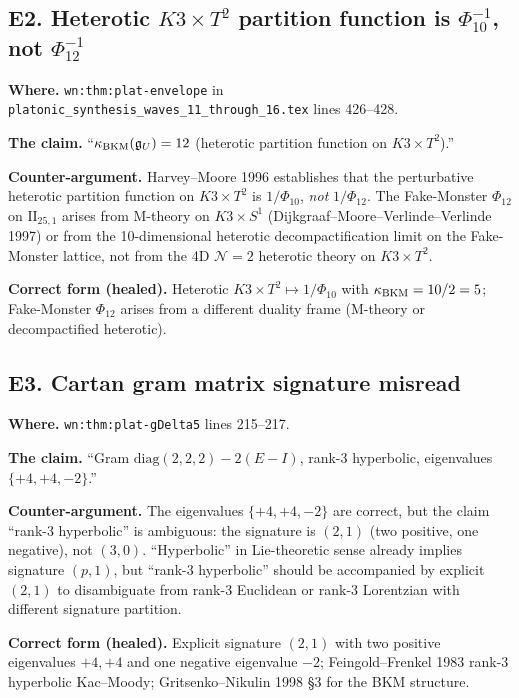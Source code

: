 \subsection*{E2. Heterotic $K3 \times T^2$ partition function is
$\Phi_{10}^{-1}$, not $\Phi_{12}^{-1}$}
\label{wn:subsec:E2-heterotic-Phi10}

\textbf{Where.} \verb|wn:thm:plat-envelope| in
\verb|platonic_synthesis_waves_11_through_16.tex| lines 426--428.

\textbf{The claim.} ``$\kappa_{\mathrm{BKM}}(\mathfrak{g}_U) = 12$ (heterotic partition
function on $K3 \times T^2$).''

\textbf{Counter-argument.} Harvey--Moore 1996 establishes that the
perturbative heterotic partition function on $K3 \times T^2$ is
$1/\Phi_{10}$, \emph{not} $1/\Phi_{12}$. The Fake-Monster $\Phi_{12}$
on $\mathrm{II}_{25, 1}$ arises from M-theory on $K3 \times S^1$
(Dijkgraaf--Moore--Verlinde--Verlinde 1997) or from the 10-dimensional
heterotic decompactification limit on the Fake-Monster lattice, not
from the 4D $\mathcal{N} = 2$ heterotic theory on $K3 \times T^2$.

\textbf{Correct form (healed).} Heterotic $K3 \times T^2 \mapsto
1/\Phi_{10}$ with $\kappa_{\mathrm{BKM}} = 10/2 = 5$; Fake-Monster $\Phi_{12}$ arises
from a different duality frame (M-theory or decompactified heterotic).

\subsection*{E3. Cartan gram matrix signature misread}
\label{wn:subsec:E3-cartan-signature}

\textbf{Where.} \verb|wn:thm:plat-gDelta5| lines 215--217.

\textbf{The claim.} ``Gram $\mathrm{diag}(2, 2, 2) - 2(E - I)$, rank-3
hyperbolic, eigenvalues $\{+4, +4, -2\}$.''

\textbf{Counter-argument.} The eigenvalues $\{+4, +4, -2\}$ are
correct, but the claim ``rank-3 hyperbolic'' is ambiguous: the
signature is $(2, 1)$ (two positive, one negative), not $(3, 0)$.
``Hyperbolic'' in Lie-theoretic sense already implies signature
$(p, 1)$, but ``rank-3 hyperbolic'' should be accompanied by explicit
$(2, 1)$ to disambiguate from rank-3 Euclidean or rank-3 Lorentzian
with different signature partition.

\textbf{Correct form (healed).} Explicit signature $(2, 1)$ with
two positive eigenvalues $+4, +4$ and one negative eigenvalue $-2$;
Feingold--Frenkel 1983 rank-3 hyperbolic Kac--Moody; Gritsenko--Nikulin
1998 \S3 for the BKM structure.

